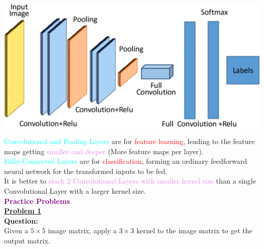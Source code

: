 \documentclass{book}
\begin{document}
\begin{center}
    \includegraphics[scale=0.2]{chapter 9/ch9_figure14.jpeg}
\end{center}
\textcolor{cyan}{Convolutional and Pooling Layers} are for \textcolor{red}{feature learning}, leading to the feature maps getting \textcolor{violet}{smaller and deeper} (More feature maps per layer).\\
\textcolor{cyan}{Fully-Connected Layers} are for \textcolor{red}{classification}, forming an ordinary feedforward neural network for the transformed inputs to be fed.\\
It is better to \textcolor{violet}{stack 2 Convolutional Layers with smaller kernel size} than a single Convolutional Layer with a larger kernel size.\\
\newpage
\textbf{\textcolor{purple}{\Large{Practice Problems}}}\\
\vspace{1mm}
\underline{\textbf{Problem 1}}\\
\textbf{Question:}\\
Given a $5 \times 5$ image matrix, apply a $3 \times 3$ kernel to the image matrix to get the output matrix.\\
\end{document}
